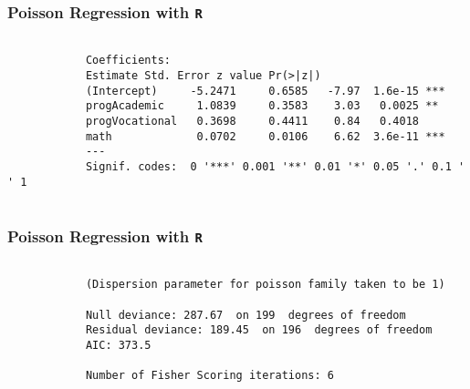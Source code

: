 \documentclass[MASTER.tex]{subfiles}
\begin{document}
	\begin{frame}[fragile]
		
		\frametitle{Poisson Regression with \texttt{R}}

			\begin{verbatim}
			
			Coefficients:
			Estimate Std. Error z value Pr(>|z|)    
			(Intercept)     -5.2471     0.6585   -7.97  1.6e-15 ***
			progAcademic     1.0839     0.3583    3.03   0.0025 ** 
			progVocational   0.3698     0.4411    0.84   0.4018    
			math             0.0702     0.0106    6.62  3.6e-11 ***
			---
			Signif. codes:  0 '***' 0.001 '**' 0.01 '*' 0.05 '.' 0.1 ' ' 1
			
			\end{verbatim}
		
	\end{frame}
	
	\begin{frame}[fragile]
		
		\frametitle{Poisson Regression with \texttt{R}}


			\begin{verbatim}
			
			(Dispersion parameter for poisson family taken to be 1)
			
			Null deviance: 287.67  on 199  degrees of freedom
			Residual deviance: 189.45  on 196  degrees of freedom
			AIC: 373.5
			
			Number of Fisher Scoring iterations: 6
			
			\end{verbatim}
	
	\end{frame}
	
\end{document}
